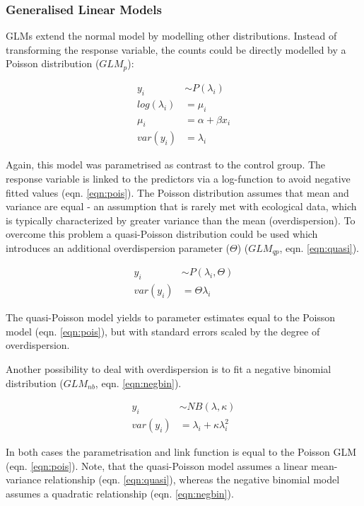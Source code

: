 \documentclass{scrartcl}
\begin{document}
\subsubsection{Generalised Linear Models}
GLMs extend the normal model by modelling other distributions.
Instead of transforming the response variable, the counts could be directly modelled by a Poisson distribution ($GLM_p$):

\begin{align}
  y_i &\sim P(\lambda_i) \nonumber \\
  log(\lambda_i) &= \mu_i \label{eqn:pois} \\
  \mu_i &= \alpha + \beta x_i \nonumber \\
  var(y_i) &= \lambda_i \nonumber
\end{align}

Again, this model was parametrised as contrast to the control group. 
The response variable is linked to the predictors via a log-function to avoid negative fitted values (eqn. \ref{eqn:pois}). 
The Poisson distribution assumes that mean and variance are equal - an assumption that is rarely met with ecological data, which is typically characterized by greater variance than the mean (overdispersion).
To overcome this problem a quasi-Poisson distribution could be used which introduces an additional overdispersion parameter ($\Theta$) ($GLM_{qp}$, eqn. \ref{eqn:quasi}).

\begin{align}
  y_i &\sim P(\lambda_i, \Theta) \label{eqn:quasi} \\
  var(y_i) &= \Theta \lambda_i  \nonumber
\end{align}

The quasi-Poisson model yields to parameter estimates equal to the Poisson model (eqn. \ref{eqn:pois}), but with standard errors scaled by the degree of overdispersion.

Another possibility to deal with overdispersion is to fit a negative binomial distribution ($GLM_{nb}$, eqn. \ref{eqn:negbin}).

\begin{align}
  y_i &\sim NB(\lambda, \kappa) \label{eqn:negbin}  \\
  var(y_i) &= \lambda_i + \kappa \lambda_i^2 \nonumber
\end{align}

In both cases the parametrisation and link function is equal to the Poisson GLM (eqn. \ref{eqn:pois}).
Note, that the quasi-Poisson model assumes a linear mean-variance relationship (eqn. \ref{eqn:quasi}), whereas the negative binomial model assumes a quadratic relationship (eqn. \ref{eqn:negbin}).
\end{document}
